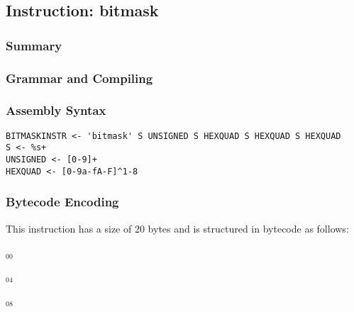 \subsection{Instruction: bitmask}

\subsubsection{Summary}


\subsubsection{Grammar and Compiling}


\subsubsection{Assembly Syntax}

\begin{myquote}
\begin{verbatim}
BITMASKINSTR <- 'bitmask' S UNSIGNED S HEXQUAD S HEXQUAD S HEXQUAD
S <- %s+
UNSIGNED <- [0-9]+
HEXQUAD <- [0-9a-fA-F]^1-8
\end{verbatim}
\end{myquote}


\subsubsection{Bytecode Encoding}

This instruction has a size of 20 bytes and is structured in bytecode as follows:

$_{00}$\ 



$_{04}$\ 



$_{08}$\ 
\fbox{%
  \parbox{20pt}{%
00
  }%
}



